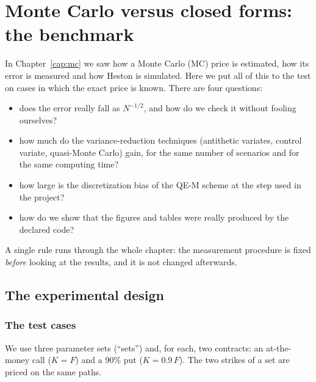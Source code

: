 \chapter{Monte Carlo versus closed forms: the benchmark}
\label{cap:benchmark}

In Chapter~\ref{cap:mc} we saw how a Monte Carlo (MC) price is estimated, how its error is measured and how Heston is
simulated. Here we put all of this to the test on cases in which the exact price is known. There are four questions:
\begin{itemize}
\item does the error really fall as $N^{-1/2}$, and how do we check it without fooling ourselves?
\item how much do the variance-reduction techniques (antithetic variates, control variate, quasi-Monte Carlo) gain,
for the same number of scenarios and for the same computing time?
\item how large is the discretization bias of the QE-M scheme at the step used in the project?
\item how do we show that the figures and tables were really produced by the declared code?
\end{itemize}
A single rule runs through the whole chapter: the measurement procedure is fixed \emph{before} looking at the
results, and it is not changed afterwards.

\section{The experimental design}
\subsection{The test cases}
We use three parameter sets (``sets'') and, for each, two contracts: an at-the-money call ($K=F$) and a 90\% put
($K=0.9\,F$). The two strikes of a set are priced on the same paths.


